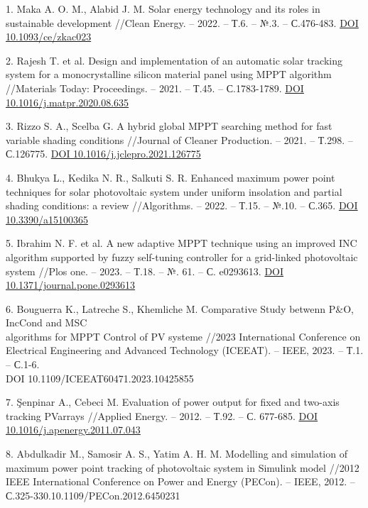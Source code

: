 \begin{references}
1. Maka A. O. M., Alabid J. M. Solar energy technology and its roles in
sustainable development //Clean Energy. -- 2022. -- Т.6. -- №.3. --
С.476-483. \href{https://doi.org/10.1093/ce/zkac023}{DOI 10.1093/ce/zkac023}

2. Rajesh T. et al. Design and implementation of an automatic solar
tracking system for a monocrystalline silicon material panel using
MPPT algorithm //Materials Today: Proceedings. -- 2021. -- Т.45. --
С.1783-1789. \href{https://doi.org/10.1016/j.matpr.2020.08.635}{DOI 10.1016/j.matpr.2020.08.635}

3. Rizzo S. A., Scelba G. A hybrid global MPPT searching method for fast
variable shading conditions //Journal of Cleaner Production. -- 2021.
-- Т.298. -- С.126775. \href{https://doi.org/10.1016/j.jclepro.2021.126775}{DOI 10.1016/j.jclepro.2021.126775}

4. Bhukya L., Kedika N. R., Salkuti S. R. Enhanced maximum power point
techniques for solar photovoltaic system under uniform insolation and
partial shading conditions: a review //Algorithms. -- 2022. -- Т.15.
-- №.10. -- С.365. \href{https://doi.org/10.3390/a15100365}{DOI 10.3390/a15100365}

5. Ibrahim N. F. et al. A new adaptive MPPT technique using an improved
INC algorithm supported by fuzzy self-tuning controller for a
grid-linked photovoltaic system //Plos one. -- 2023. -- Т.18. -- №.
61. -- С. e0293613. \href{https://doi.org/10.1371/journal.pone.0293613}{DOI 10.1371/journal.pone.0293613}

6. Bouguerra K., Latreche S., Khemliche M. Comparative Study betwenn
P\&O, IncCond and MSC \\algorithms for MPPT Control of PV systeme
//2023 International Conference on Electrical Engineering and Advanced
Technology (ICEEAT). -- IEEE, 2023. -- Т.1. -- С.1-6.\\
DOI 10.1109/ICEEAT60471.2023.10425855

7. Şenpinar A., Cebeci M. Evaluation of power output for fixed and
two-axis tracking PVarrays //Applied Energy. -- 2012. -- Т.92. -- С.
677-685.
\href{https://doi.org/10.1016/j.apenergy.2011.07.043}{DOI 10.1016/j.apenergy.2011.07.043}

8. Abdulkadir M., Samosir A. S., Yatim A. H. M. Modelling and simulation
of maximum power point tracking of photovoltaic system in Simulink
model //2012 IEEE International Conference on Power and Energy
(PECon). -- IEEE, 2012. -- С.325-330.10.1109/PECon.2012.6450231


\end{references}
